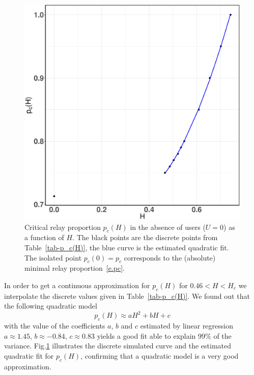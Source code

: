 \documentclass[conference]{IEEEtran}
\begin{document}
\begin{figure}[t!]
\centering
\includegraphics[width=0.60\linewidth]{Figures/pcH}
\caption{Critical relay proportion $p_c(H)$ in the absence of users ($U=0$) as a function of $H$. The black points are the discrete points from Table~\ref{tab-p_c(H)}, the blue curve is the estimated quadratic fit.
The isolated point $p_c(0)=p_c$ corresponds to the (absolute) minimal relay proportion~\eqref{e.pc}. }
\label{quadratic-fit-p_c(H)}
\end{figure}


\indent  In order to get a continuous approximation for $p_c(H)$ for $0.46<H<H_c$ we interpolate the discrete values given in Table~\ref{tab-p_c(H)}. 
We found out that the following quadratic model %
\begin{equation}
\label{quadratic-model}
p_c(H) \approx aH^{2} + bH + c
\end{equation}
with the  value of the coefficients $a$, $b$ and $c$ estimated by linear regression
$a \approx 1.45$, $b \approx -0.84$, $c \approx 0.83$
yields a good fit able to explain 99\% of the variance. Fig.\ref{quadratic-fit-p_c(H)} illustrates the discrete simulated curve and the estimated quadratic fit for $p_c(H)$, confirming that a quadratic model is a very good approximation.
\end{document}
